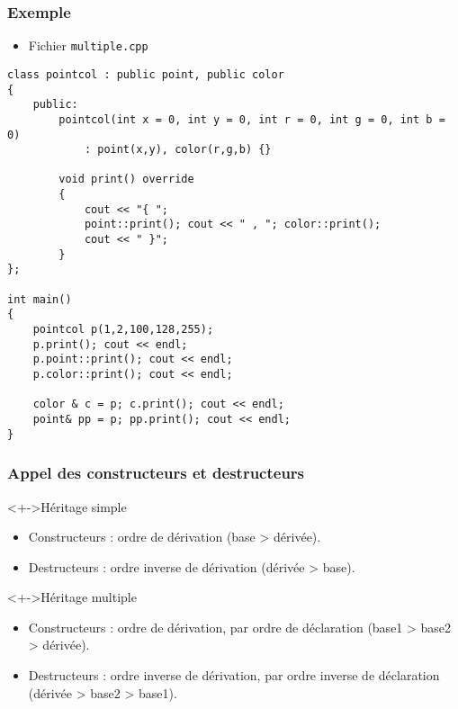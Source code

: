 \begin{frame}[containsverbatim]
\frametitle{Exemple}
\begin{itemize}
\item Fichier \texttt{multiple.cpp}
\end{itemize}
\begin{lstlisting}
class pointcol : public point, public color
{	
	public:
		pointcol(int x = 0, int y = 0, int r = 0, int g = 0, int b = 0) 
			: point(x,y), color(r,g,b) {}

		void print() override
		{
			cout << "{ "; 
			point::print(); cout << " , "; color::print();
			cout << " }";
		}
};

int main()
{
	pointcol p(1,2,100,128,255);
	p.print(); cout << endl;
	p.point::print(); cout << endl;
	p.color::print(); cout << endl;
	
	color & c = p; c.print(); cout << endl;	
	point& pp = p; pp.print(); cout << endl;
}
\end{lstlisting}
\end{frame}


\begin{frame}
\frametitle{Appel des constructeurs et destructeurs}
\begin{exampleblock}<+->{Héritage simple}
	\begin{itemize}[<+->]
	\item Constructeurs : ordre de dérivation (base > dérivée).
	\item Destructeurs : ordre inverse de dérivation (dérivée > base).
	\end{itemize}
\end{exampleblock}
\begin{exampleblock}<+->{Héritage multiple}
	\begin{itemize}[<+->]
	\item Constructeurs : ordre de dérivation, par ordre de déclaration (base1 > base2 > dérivée).
	\item Destructeurs : ordre inverse de dérivation, par ordre inverse de déclaration (dérivée > base2 > base1).
	\end{itemize}
\end{exampleblock}
\end{frame}

